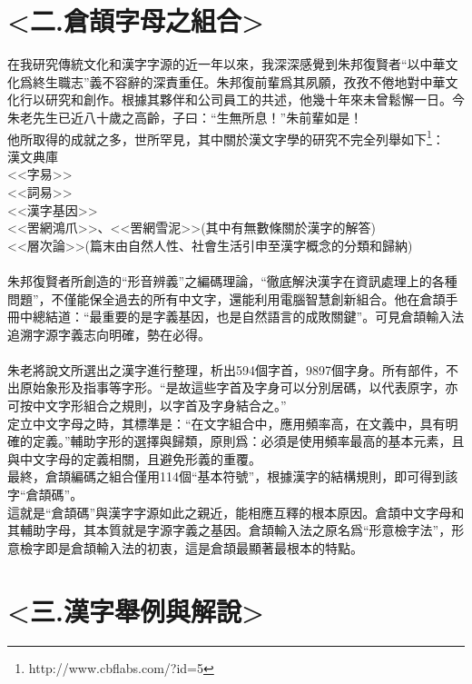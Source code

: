 \documentclass{article}
\begin{document}
\section{<二.倉頡字母之組合>}

在我研究傳統文化和漢字字源的近一年以來，我深深感覺到朱邦復賢者“以中華文化爲終生職志”義不容辭的深責重仼。朱邦復前輩爲其夙願，孜孜不倦地對中華文化行以研究和創作。根據其夥伴和公司員工的共述，他幾十年來未曾鬆懈一日。今朱老先生已近八十歲之高齡，子曰：“生無所息！”朱前輩如是！\\
他所取得的成就之多，世所罕見，其中關於漢文字學的研究不完全列舉如下\footnote{http://www.cbflabs.com/?id=5}：\\
漢文典庫\\
<<字易>>\\
<<詞易>>\\
<<漢字基因>>\\
<<罟網鴻爪>>、<<罟網雪泥>>(其中有無數條關於漢字的解答)\\
<<層次論>>(篇末由自然人性、社會生活引申至漢字概念的分類和歸納)\\
\\
朱邦復賢者所創造的“形音辨義”之編碼理論，“徹底解決漢字在資訊處理上的各種問題”，不僅能保全過去的所有中文字，還能利用電腦智慧創新組合。他在倉頡手冊中總結道：“最重要的是字義基因，也是自然語言的成敗關鍵”。可見倉頡輸入法追溯字源字義志向明確，勢在必得。\\
\\
朱老將說文所選出之漢字進行整理，析出594個字首，9897個字身。所有部件，不出原始象形及指事等字形。“是故這些字首及字身可以分別居碼，以代表原字，亦可按中文字形組合之規則，以字首及字身結合之。”\\
定立中文字母之時，其標準是：“在文字組合中，應用頻率高，在文義中，具有明確的定義。”輔助字形的選擇與歸類，原則爲：必須是使用頻率最高的基本元素，且與中文字母的定義相關，且避免形義的重覆。\\
最終，倉頡編碼之組合僅用114個“基本符號”，根據漢字的結構規則，即可得到該字“倉頡碼”。\\
這就是“倉頡碼”與漢字字源如此之親近，能相應互釋的根本原因。倉頡中文字母和其輔助字母，其本質就是字源字義之基因。倉頡輸入法之原名爲“形意檢字法”，形意檢字即是倉頡輸入法的初衷，這是倉頡最顯著最根本的特點。\\



\section{<三.漢字舉例與解說>}
\end{document}
